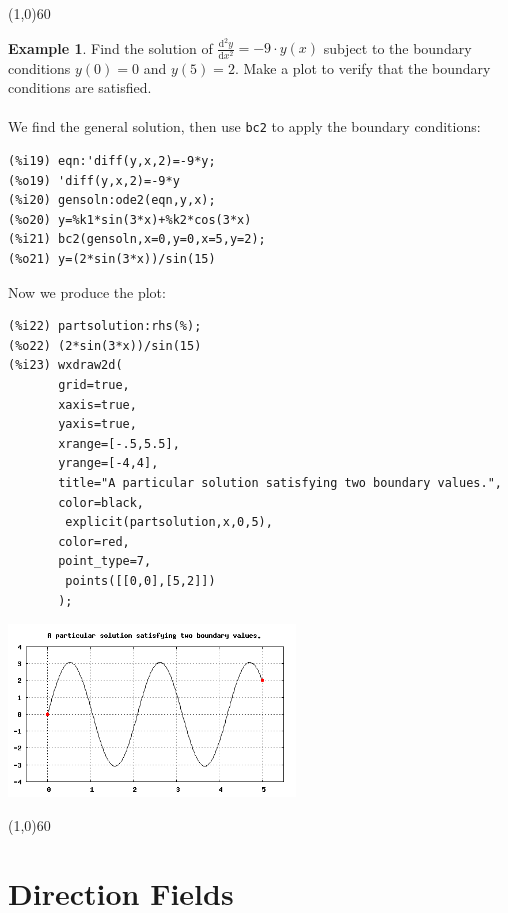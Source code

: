 \documentclass[10.5pt,twoside]{report}
\theoremstyle{definition}
\newtheorem{exmp}{Example}[section]
\begin{document}
\line(1,0){60}
\linethickness{0.5mm}

\begin{exmp} Find the solution of $\frac{\mathrm{d}^2 y}{\mathrm{d}x^2}=-9\cdot y(x)$ subject to the boundary conditions $y(0)=0$ and $y(5)=2$.  Make a plot to verify that the boundary conditions are satisfied.\\

${}$\\

We find the general solution, then use \verb|bc2| to apply the boundary conditions:

\begin{verbatim}
(%i19) eqn:'diff(y,x,2)=-9*y;
(%o19) 'diff(y,x,2)=-9*y
(%i20) gensoln:ode2(eqn,y,x);
(%o20) y=%k1*sin(3*x)+%k2*cos(3*x)
(%i21) bc2(gensoln,x=0,y=0,x=5,y=2);
(%o21) y=(2*sin(3*x))/sin(15)
\end{verbatim}

Now we produce the plot:

\begin{verbatim}
(%i22) partsolution:rhs(%);
(%o22) (2*sin(3*x))/sin(15)
(%i23) wxdraw2d(
       grid=true,
       xaxis=true,
       yaxis=true,
       xrange=[-.5,5.5],
       yrange=[-4,4],
       title="A particular solution satisfying two boundary values.",
       color=black,
        explicit(partsolution,x,0,5),
       color=red,
       point_type=7,
        points([[0,0],[5,2]])
       );
\end{verbatim}

\includegraphics[width=3in]{example_4_3_4_1}

\end{exmp}

\line(1,0){60}
\linethickness{0.5mm}
\pagebreak

\pagebreak

\section{Direction Fields}\label{Direction Fields}
\end{document}
